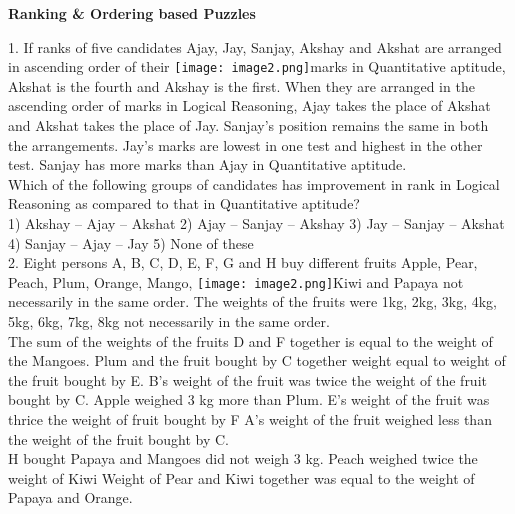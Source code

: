 \documentclass[
]{article}
\author{}
\date{}
\begin{document}
	
 

\begin{center}
	{\Large \textbf{Ranking \& Ordering based Puzzles \\}}
\end{center}

1. If ranks of five candidates Ajay, Jay, Sanjay, Akshay and Akshat are arranged in ascending
order of their \texttt{[image: image2.png]}marks in Quantitative aptitude, Akshat is the fourth and Akshay is the first.
When they are arranged in the ascending order of marks in Logical Reasoning, Ajay takes the
place of Akshat and Akshat takes the place of Jay. Sanjay’s position remains the same in both
the arrangements. Jay’s marks are lowest in one test and highest in the other test. Sanjay has
more marks than Ajay in Quantitative aptitude.\\
Which of the following groups of candidates has improvement in rank in Logical Reasoning
as compared to that in Quantitative aptitude?\\
1) Akshay – Ajay – Akshat \hspace{2mm}2) Ajay – Sanjay – Akshay
\hspace{2mm}3) Jay – Sanjay – Akshat \hspace{2mm}4) Sanjay – Ajay – Jay
\hspace{2mm}5) None of these\\

2. Eight persons A, B, C, D, E, F, G and H buy different fruits Apple, Pear, Peach, Plum, Orange,
Mango, \texttt{[image: image2.png]}Kiwi and Papaya not necessarily in the same order. The weights of the fruits were
1kg, 2kg, 3kg, 4kg, 5kg, 6kg, 7kg, 8kg not necessarily in the same order.\\
The sum of the weights of the fruits D and F together is equal to the weight of the Mangoes.
Plum and the fruit bought by C together weight equal to weight of the fruit bought by E.
B's weight of the fruit was twice the weight of the fruit bought by C.
Apple weighed 3 kg more than Plum.
E's weight of the fruit was thrice the weight of fruit bought by F
A's weight of the fruit weighed less than the weight of the fruit bought by C.\\
H bought Papaya and Mangoes did not weigh 3 kg.
Peach weighed twice the weight of Kiwi
Weight of Pear and Kiwi together was equal to the weight of Papaya and Orange.\\
\end{document}
